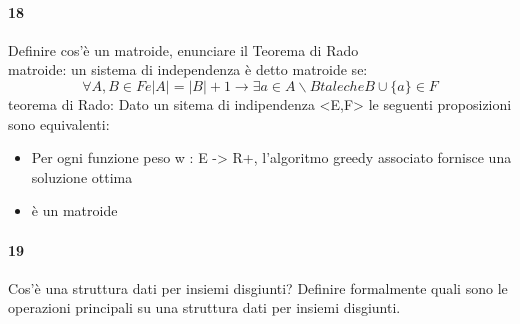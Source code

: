 \documentclass[12pt, a4paper, openany]{book}
\begin{document}
\paragraph{18}
Definire cos’è un matroide, enunciare il Teorema di Rado\\
matroide: un sistema di independenza è detto matroide se:
\begin{equation*}
	\forall A, B \in F e |A| = |B| + 1 \rightarrow \exists a \in A\backslash B tale che B \cup \{a\} \in F
\end{equation*}
teorema di Rado: Dato un sitema di indipendenza <E,F> le seguenti proposizioni sono equivalenti:
\begin{itemize}
	\item Per ogni funzione peso w : E -> R+, l'algoritmo greedy associato fornisce una soluzione ottima
	\item <E,F> è un matroide
\end{itemize}
\paragraph{19}
Cos’è una struttura dati per insiemi disgiunti? Definire formalmente quali
sono le operazioni principali su una struttura dati per insiemi disgiunti.
\end{document}
